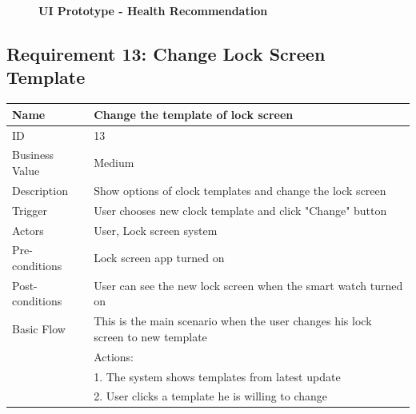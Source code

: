 \documentclass{article}
\begin{document}
		\begin{figure}[htbp]
			\textbf{UI Prototype - Health Recommendation}
			\centering
			\begin{subfigure}{\textwidth}
				\resizebox{\textwidth}{!}{}
			\end{subfigure}
			\begin{subfigure}{\textwidth}
			
			\end{subfigure}
		\end{figure}
		\clearpage
		
		
		\subsection{Requirement 13: Change Lock Screen Template}
		\begin{table}[htbp]
			\centering
			\small
			\begin{tabularx}{\textwidth}{|>{\raggedright\arraybackslash}p{}|X|}
				\hline
				Name             & Change the template of lock screen                                \\ \hline
				ID               & 13                                                                                       \\ \hline
				Business Value   & Medium                                                                                    \\ \hline
				Description      & Show options of clock templates and change the lock screen \\ \hline
				Trigger          & User chooses new clock template and click "Change" button \\ \hline
				Actors           & User, Lock screen system                                \\ \hline
				Pre-conditions   & Lock screen app turned on                                    \\ \hline
				Post-conditions  & User can see the new lock screen when the smart watch turned on                                                        \\ \hline
				Basic Flow       & This is the main scenario when the user changes his lock screen to new template \\ \hline
								 & Actions: \\
								 & 1. The system shows templates from latest update\\
								 & 2. User clicks a template he is willing to change \\

\end{tabularx}
\end{table}
\end{document}
